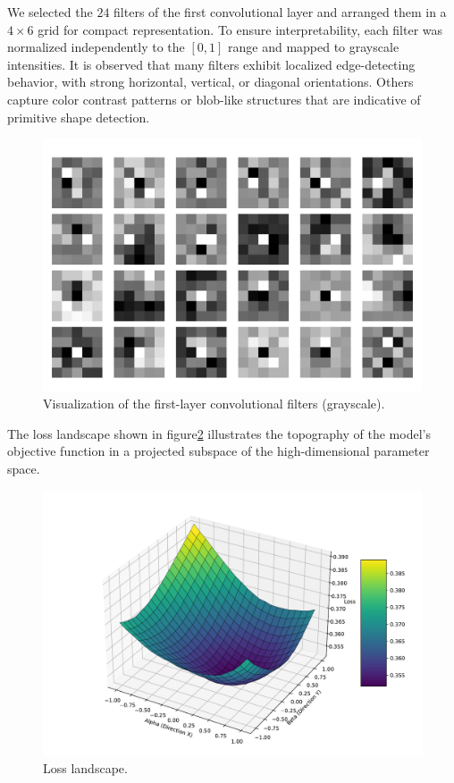 \documentclass{article}
\begin{document}
We selected the $24$ filters of the first convolutional layer and arranged them in a $4\times 6$ grid for compact representation. To ensure interpretability, each filter was normalized independently to the $[0, 1]$ range and mapped to grayscale intensities. It is observed that many filters exhibit localized edge-detecting behavior, with strong horizontal, vertical, or diagonal orientations. Others capture color contrast patterns or blob-like structures that are indicative of primitive shape detection.

\begin{figure}[H]
  \centering
  \includegraphics[width=0.8\linewidth]{figures/filter_visualization.pdf}
  \caption{Visualization of the first-layer convolutional filters (grayscale).}
  \label{fig:first_layer_filters}
\end{figure}

The loss landscape shown in figure\ref{fig:loss_landscape} illustrates the topography of the model's objective function in a projected subspace of the high-dimensional parameter space.

\begin{figure}[H]
  \centering
  \includegraphics[width=0.8\linewidth]{figures/loss_landscape_3d.pdf}
  \caption{Loss landscape.}
  \label{fig:loss_landscape}
\end{figure}
\end{document}
